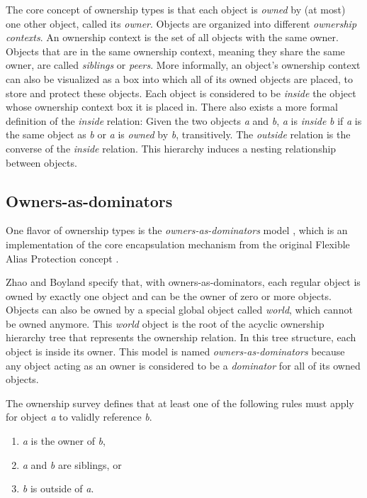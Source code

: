 \documentclass[sigplan,11pt,nonacm]{acmart}
\begin{document}
The core concept of ownership types is that each object is \emph{owned} by (at most) one other object, called its \emph{owner}.
Objects are organized into different \emph{ownership contexts}.
An ownership context is the set of all objects with the same owner.
Objects that are in the same ownership context, meaning they share the same owner, are called \emph{siblings} or \emph{peers}.
More informally, an object's ownership context can also be visualized as a box into which all of its owned objects are placed, to store and protect these objects.
Each object is considered to be \emph{inside} the object whose ownership context box it is placed in.
There also exists a more formal definition of the \emph{inside} relation:
Given the two objects \emph{a} and \emph{b}, \emph{a} is \emph{inside} \emph{b} if \emph{a} is the same object as \emph{b} or \emph{a} is \emph{owned} by \emph{b}, transitively.
The \emph{outside} relation is the converse of the \emph{inside} relation.
This hierarchy induces a nesting relationship between objects. \cite{ownership-types-survey}


\subsection{Owners-as-dominators}
\label{sec:owners-as-dominators}

One flavor of ownership types is the \emph{owners-as-dominators} model \cite{ownership-types-survey}, which is an implementation of the core encapsulation mechanism from the original Flexible Alias Protection concept \cite{flexible-alias-protection}.

Zhao and Boyland \cite{permission-ownership-types} specify that, with owners-as-dominators, each regular object is owned by exactly one object and can be the owner of zero or more objects.
Objects can also be owned by a special global object called \emph{world}, which cannot be owned anymore.
This \emph{world} object is the root of the acyclic ownership hierarchy tree that represents the ownership relation.
In this tree structure, each object is inside its owner.
This model is named \emph{owners-as-dominators} because any object acting as an owner is considered to be a \emph{dominator} for all of its owned objects.

The ownership survey \cite{ownership-types-survey} defines that at least one of the following rules must apply for object \emph{a} to validly reference \emph{b}.
\begin{enumerate}
  \item \emph{a} is the owner of \emph{b},
  \item \emph{a} and \emph{b} are siblings, or
  \item \emph{b} is outside of \emph{a}.
\end{enumerate}
\end{document}
